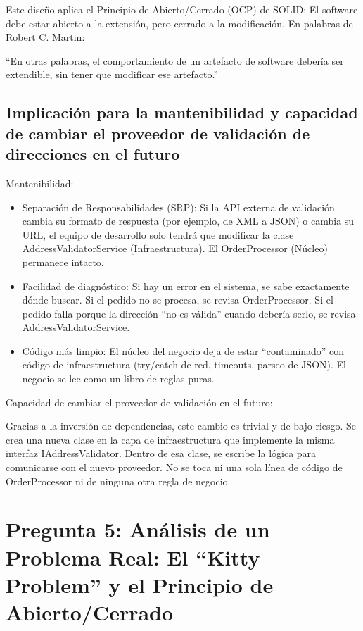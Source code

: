 \documentclass[12pt, a4paper]{article}
\begin{document}
        Este diseño aplica el Principio de Abierto/Cerrado (OCP) de SOLID: El software debe estar abierto a la extensión, pero cerrado a la modificación. En palabras de Robert C. Martin:

        “En otras palabras, el comportamiento de un artefacto de software debería ser extendible, sin tener que modificar ese artefacto.”
        \subsection{Implicación para la mantenibilidad y capacidad de cambiar el proveedor de validación de direcciones en el futuro}
        Mantenibilidad:
        \begin{itemize}
            \item Separación de Responsabilidades (SRP): Si la API externa de validación cambia su formato de respuesta (por ejemplo, de XML a JSON) o cambia su URL, el equipo de desarrollo solo tendrá que modificar la clase AddressValidatorService (Infraestructura). El OrderProcessor (Núcleo) permanece intacto.
            \item Facilidad de diagnóstico: Si hay un error en el sistema, se sabe exactamente dónde buscar. Si el pedido no se procesa, se revisa OrderProcessor. Si el pedido falla porque la dirección ``no es válida'' cuando debería serlo, se revisa AddressValidatorService.
            \item Código más limpio: El núcleo del negocio deja de estar ``contaminado'' con código de infraestructura (try/catch de red, timeouts, parseo de JSON). El negocio se lee como un libro de reglas puras.
        \end{itemize}

        Capacidad de cambiar el proveedor de validación en el futuro:

        Gracias a la inversión de dependencias, este cambio es trivial y de bajo riesgo. Se crea una nueva clase en la capa de infraestructura que implemente la misma interfaz IAddressValidator. Dentro de esa clase, se escribe la lógica para comunicarse con el nuevo proveedor. No se toca ni una sola línea de código de OrderProcessor ni de ninguna otra regla de negocio.

        \section[Análisis de un Problema Real: El ``Kitty Problem'' y el Principio de Abierto/Cerrado]{Pregunta 5: Análisis de un Problema Real: El ``Kitty Problem'' y el Principio de Abierto/Cerrado}
        
\end{document}
